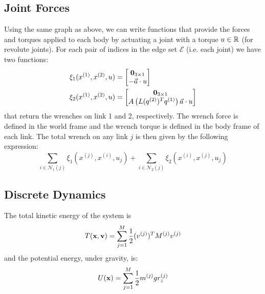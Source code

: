 \documentclass[conference]{IEEEtran}
\begin{document}
\subsection{Joint Forces}
Using the same graph as above, we can write functions that provide the forces and torques 
applied to each body by actuating a joint with a torque $u \in \mathbb{R}$ (for revolute joints). 
For each pair of indices in the edge set $\mathcal{E}$ (i.e. each joint) we have two 
functions: 
\begin{subequations}
    \begin{align}
    \xi_1(x^{(1)}, x^{(2)}, u) &= \begin{bmatrix}
        \mathbf{0}_{3 \times 1} \\ -\vec{a} \cdot u
    \end{bmatrix} \\
    \xi_2(x^{(1)}, x^{(2)}, u) &= \begin{bmatrix}
        \mathbf{0}_{3 \times 1} \\
        A\left(L(q^{(2)})^T q^{(1)}\right) \vec{a} \cdot u
    \end{bmatrix}
    \end{align} 
\end{subequations}
that return the wrenches on link 1 and 2, respectively. The wrench force is defined in the 
world frame and the wrench torque is defined in the body frame of each link.
The total wrench on any link $j$ is then given by the following expression:
\begin{equation} \label{eq:link_wrench}
    \sum_{i \in \mathcal{N}_1(j)} \xi_1\left(x^{(j)}, x^{(i)}, u_j\right) + 
    \sum_{i \in \mathcal{N}_2(j)} \xi_2\left(x^{(i)}, x^{(j)}, u_j\right)
\end{equation}

\subsection{Discrete Dynamics} \label{sec:discrete_dynamics}

The total kinetic energy of the system is 
\begin{equation}
    T(\mathbf{x},\mathbf{v}) = \sum_{j=1}^M \frac{1}{2} (v^{(j)})^T M^{(j)} v^{(j)}
\end{equation}
and the potential energy, under gravity, is:
\begin{equation}
    U(\mathbf{x}) = \sum_{j=1}^M \frac{1}{2} m^{(j)} g r_z^{(j)}
\end{equation}
\end{document}
